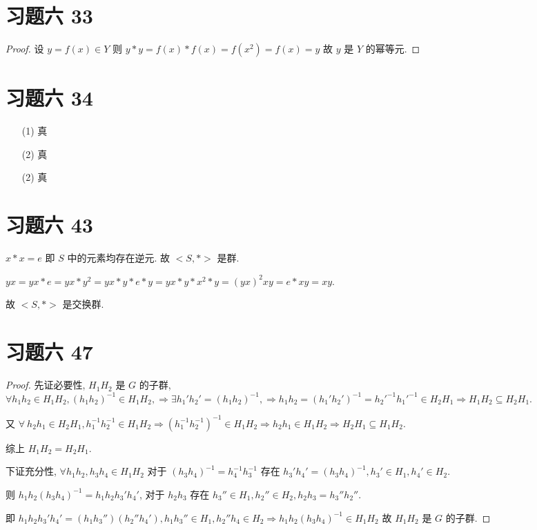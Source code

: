 \section{习题六 33}

\begin{proof}
	设 $y=f(x)\in Y$ 则 $y*y=f(x)*f(x)=f(x^2)=f(x)=y$ 故 $y$ 是 $Y$ 的幂等元.
\end{proof}

\section{习题六 34}

\begin{itemize}
	\item[(1)] 真
	\item[(2)] 真
	\item[(2)] 真
\end{itemize}

\section{习题六 43}

$x*x=e$ 即 $S$ 中的元素均存在逆元. 故 $<S,*>$ 是群.

$yx=yx*e=yx*y^2=yx*y*e*y=yx*y*x^2*y=(yx)^2xy=e*xy=xy$.

故 $<S,*>$ 是交换群.

\section{习题六 47}

\begin{proof}
	先证必要性, $H_1H_2$ 是 $G$ 的子群, $\forall h_1h_2\in H_1H_2,(h_1h_2)^{-1}\in H_1H_2,\Rightarrow\exists h_1'h_2'=(h_1h_2)^{-1},\Rightarrow h_1h_2=(h_1'h_2')^{-1}=h_2'^{-1}h_1'^{-1}\in H_2H_1\Rightarrow H_1H_2\subseteq H_2H_1$.
	
	又 $\forall\ h_2h_1\in H_2H_1,h_1^{-1}h_2^{-1}\in H_1H_2\Rightarrow (h_1^{-1}h_2^{-1})^{-1}\in H_1H_2\Rightarrow h_2h_1\in H_1H_2\Rightarrow H_2H_1\subseteq H_1H_2$.
	
	综上 $H_1H_2=H_2H_1$. 
	
	下证充分性, $\forall h_1h_2,h_3h_4\in H_1H_2$ 对于 $(h_3h_4)^{-1}=h_4^{-1}h_3^{-1}$ 存在 $h_3'h_4'=(h_3h_4)^{-1},h_3'\in H_1,h_4'\in H_2$.
	
	则 $h_1h_2(h_3h_4)^{-1}=h_1h_2h_3'h_4'$, 对于 $h_2h_3$ 存在 $h_3''\in H_1,h_2''\in H_2,h_2h_3=h_3''h_2''$.
	
	即 $h_1h_2h_3'h_4'=(h_1h_3'')(h_2''h_4'),h_1h_3''\in H_1,h_2''h_4\in H_2\Rightarrow h_1h_2(h_3h_4)^{-1}\in H_1H_2$ 故 $H_1H_2$ 是 $G$ 的子群.
\end{proof}

